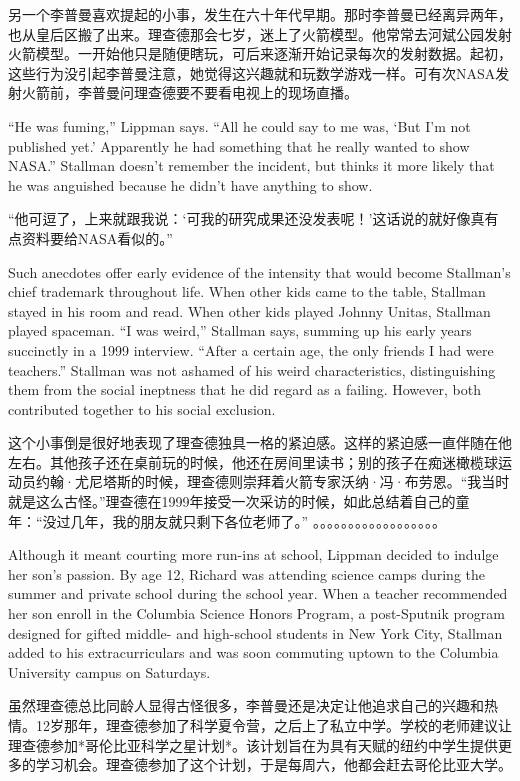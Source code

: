 \ifdefined\chs
另一个李普曼喜欢提起的小事，发生在六十年代早期。那时李普曼已经离异两年，也从皇后区搬了出来。理查德那会七岁，迷上了火箭模型。他常常去河斌公园发射火箭模型。一开始他只是随便瞎玩，可后来逐渐开始记录每次的发射数据。起初，这些行为没引起李普曼注意，她觉得这兴趣就和玩数学游戏一样。可有次NASA发射火箭前，李普曼问理查德要不要看电视上的现场直播。
\fi

\ifdefined\eng
``He was fuming,'' Lippman says. ``All he could say to me was, `But I'm not published yet.' Apparently he had something that he really wanted to show NASA.''  Stallman doesn't remember the incident, but thinks it more likely that he was anguished because he didn't have anything to show.
\fi

\ifdefined\chs
“他可逗了，上来就跟我说：‘可我的研究成果还没发表呢！’这话说的就好像真有点资料要给NASA看似的。”
\fi

\ifdefined\eng
Such anecdotes offer early evidence of the intensity that would become Stallman's chief trademark throughout life. When other kids came to the table, Stallman stayed in his room and read. When other kids played Johnny Unitas, Stallman played spaceman. ``I was weird,'' Stallman says, summing up his early years succinctly in a 1999 interview. ``After a certain age, the only friends I had were teachers.''  Stallman was not ashamed of his weird characteristics, distinguishing them from the social ineptness that he did regard as a failing.  However, both contributed together to his social exclusion.
\fi

\ifdefined\chs
这个小事倒是很好地表现了理查德独具一格的紧迫感。这样的紧迫感一直伴随在他左右。其他孩子还在桌前玩的时候，他还在房间里读书；别的孩子在痴迷橄榄球运动员约翰·尤尼塔斯的时候，理查德则崇拜着火箭专家沃纳·冯·布劳恩。“我当时就是这么古怪。”理查德在1999年接受一次采访的时候，如此总结着自己的童年：“没过几年，我的朋友就只剩下各位老师了。” 。。。。。。。。。。。。。。。。。。
\fi

\ifdefined\eng
Although it meant courting more run-ins at school, Lippman decided to indulge her son's passion. By age 12, Richard was attending science camps during the summer and private school during the school year. When a teacher recommended her son enroll in the Columbia Science Honors Program, a post-Sputnik program designed for gifted middle- and high-school students in New York City, Stallman added to his extracurriculars and was soon commuting uptown to the Columbia University campus on Saturdays.
\fi

\ifdefined\chs
虽然理查德总比同龄人显得古怪很多，李普曼还是决定让他追求自己的兴趣和热情。12岁那年，理查德参加了科学夏令营，之后上了私立中学。学校的老师建议让理查德参加*哥伦比亚科学之星计划*。该计划旨在为具有天赋的纽约中学生提供更多的学习机会。理查德参加了这个计划，于是每周六，他都会赶去哥伦比亚大学。
\fi

